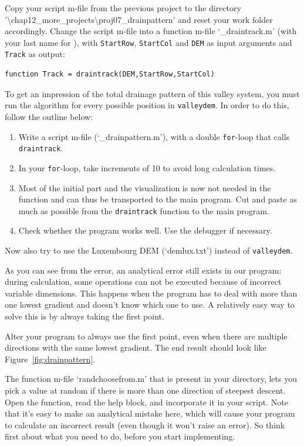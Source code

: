 \begin{action}
Copy your script m-file from the previous project to the directory '\textbackslash{}chap12\_more\_projects\textbackslash{}proj07\_drainpattern'  and reset your work folder accordingly. Change the script m-file into a function m-file `\_draintrack.m' (with your last name for ), with {\tt StartRow}, {\tt StartCol} and {\tt DEM} as input arguments and {\tt Track} as output:
\end{action}
\begin{lstlisting}[numbers=none]
function Track = draintrack(DEM,StartRow,StartCol)
\end{lstlisting}
To get an impression of the total drainage pattern of this valley system, you must run the algorithm for every possible position in {\tt valleydem}. In order to do this, follow the outline below:
\begin{enumerate}
\item Write a script m-file (`\_drainpattern.m'), with a double {\tt for}-loop that calls {\tt draintrack}. 
\item In your {\tt for}-loop, take increments of 10 to avoid long calculation times. 
\item Most of the initial part and the visualization is now not needed in the function and can thus be transported to the main program. Cut and paste as much as possible from the {\tt draintrack} function to the main program. 
\item Check whether the program works well. Use the debugger if necessary.
\end{enumerate}
\begin{action}
Now also try to use the Luxembourg DEM (`demlux.txt') instead of {\tt valleydem}.
\end{action}
As you can see from the error, an analytical error still exists in our program: during calculation, some operations can not be executed because of incorrect variable dimensions. This happens when the program has to deal with more than one lowest gradient and doesn't know which one to use. A relatively easy way to solve this is by always taking the first point.
\begin{action}
Alter your program to always use the first point, even when there are multiple directions with the same lowest gradient. The end result should look like Figure~\ref{fig:drainpattern}.
\end{action}
\begin{action}
The function m-file `randchoosefrom.m' that is present in your directory, lets you pick a value at random if there is more than one direction of steepest descent. Open the function, read the help block, and incorporate it in your script. Note that it's easy to make an analytical mistake here, which will cause your program to calculate an incorrect result (even though it won't raise an error). So think first about what you need to do, before you start implementing.
\end{action}

